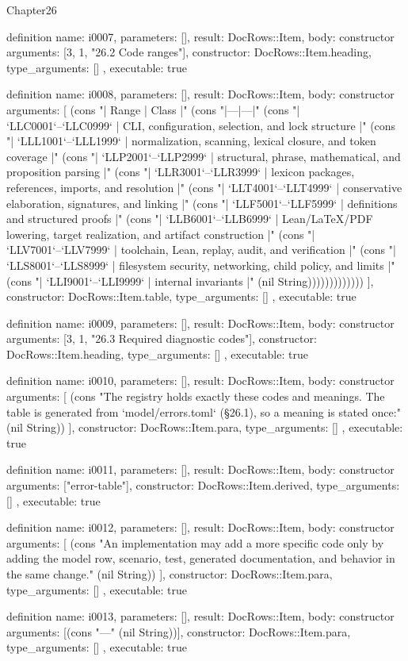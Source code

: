\begin{lexlean}{Chapter26}
\begin{semanticmodule}
definition{
  name: i0007,
  parameters: [],
  result: DocRows::Item,
  body: constructor{
    arguments: [3, 1, "26.2 Code ranges"],
    constructor: DocRows::Item.heading,
    type_arguments: []
  },
  executable: true
}

definition{
  name: i0008,
  parameters: [],
  result: DocRows::Item,
  body: constructor{
    arguments: [
      (cons "| Range | Class |" (cons "|---|---|" (cons "| `LLC0001`–`LLC0999` | CLI, configuration, selection, and lock structure |" (cons "| `LLL1001`–`LLL1999` | normalization, scanning, lexical closure, and token coverage |" (cons "| `LLP2001`–`LLP2999` | structural, phrase, mathematical, and proposition parsing |" (cons "| `LLR3001`–`LLR3999` | lexicon packages, references, imports, and resolution |" (cons "| `LLT4001`–`LLT4999` | conservative elaboration, signatures, and linking |" (cons "| `LLF5001`–`LLF5999` | definitions and structured proofs |" (cons "| `LLB6001`–`LLB6999` | Lean/LaTeX/PDF lowering, target realization, and artifact construction |" (cons "| `LLV7001`–`LLV7999` | toolchain, Lean, replay, audit, and verification |" (cons "| `LLS8001`–`LLS8999` | filesystem security, networking, child policy, and limits |" (cons "| `LLI9001`–`LLI9999` | internal invariants |" (nil String)))))))))))))
    ],
    constructor: DocRows::Item.table,
    type_arguments: []
  },
  executable: true
}

definition{
  name: i0009,
  parameters: [],
  result: DocRows::Item,
  body: constructor{
    arguments: [3, 1, "26.3 Required diagnostic codes"],
    constructor: DocRows::Item.heading,
    type_arguments: []
  },
  executable: true
}

definition{
  name: i0010,
  parameters: [],
  result: DocRows::Item,
  body: constructor{
    arguments: [
      (cons "The registry holds exactly these codes and meanings. The table is generated from `model/errors.toml` (§26.1), so a meaning is stated once:" (nil String))
    ],
    constructor: DocRows::Item.para,
    type_arguments: []
  },
  executable: true
}

definition{
  name: i0011,
  parameters: [],
  result: DocRows::Item,
  body: constructor{
    arguments: ["error-table"],
    constructor: DocRows::Item.derived,
    type_arguments: []
  },
  executable: true
}

definition{
  name: i0012,
  parameters: [],
  result: DocRows::Item,
  body: constructor{
    arguments: [
      (cons "An implementation may add a more specific code only by adding the model row, scenario, test, generated documentation, and behavior in the same change." (nil String))
    ],
    constructor: DocRows::Item.para,
    type_arguments: []
  },
  executable: true
}

definition{
  name: i0013,
  parameters: [],
  result: DocRows::Item,
  body: constructor{
    arguments: [(cons "---" (nil String))],
    constructor: DocRows::Item.para,
    type_arguments: []
  },
  executable: true
}
\end{semanticmodule}
\end{lexlean}

